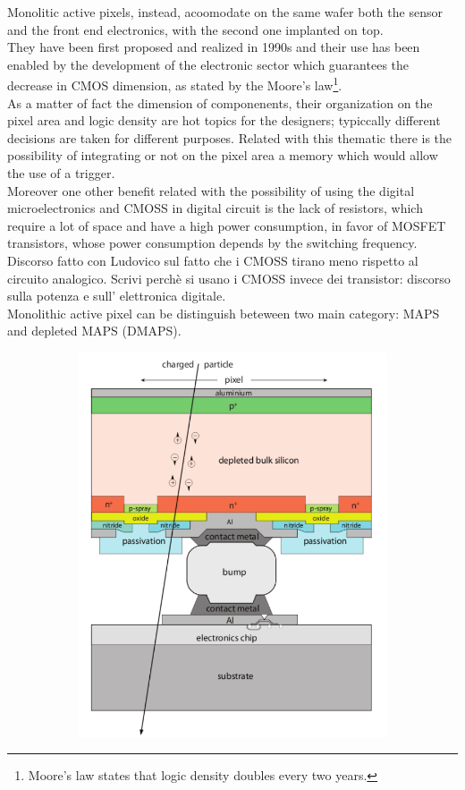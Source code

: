 \begin{titlepage}
Monolitic active pixels, instead, acoomodate on the same wafer both the sensor and the front end electronics, with the second one implanted on top.\\
They have been first proposed and realized in 1990s and their use has been enabled by the development of the electronic sector which guarantees the decrease in CMOS dimension, as stated by the Moore's law\footnote{Moore's law states that logic density doubles every two years.}.\\
As a matter of fact the dimension of componenents, their organization on the pixel area and logic density are hot topics for the designers; typiccally different decisions are taken for different purposes. Related with this thematic there is the possibility of integrating or not on the pixel area a memory which would allow the use of a trigger. \\ 
Moreover one other benefit related with the possibility of using the digital microelectronics
and CMOSS in digital circuit is the lack of resistors, which require a lot of
space and have a high power consumption, in favor of MOSFET transistors, whose power
consumption depends by the switching frequency. Discorso fatto con Ludovico
sul fatto che i CMOSS tirano meno rispetto al circuito analogico.
Scrivi perchè si usano i CMOSS invece dei transistor: discorso sulla potenza e sull'
elettronica digitale.\\
Monolithic active pixel can be distinguish beteween two main category: MAPS and depleted
MAPS (DMAPS).\\
\begin{figure}
   \begin{subfigure}{.5\textwidth}
     \centering
     \includegraphics[width=.6\linewidth]{figures/hybrid_scheme.png}

\end{subfigure}
\end{figure}
\end{titlepage}
